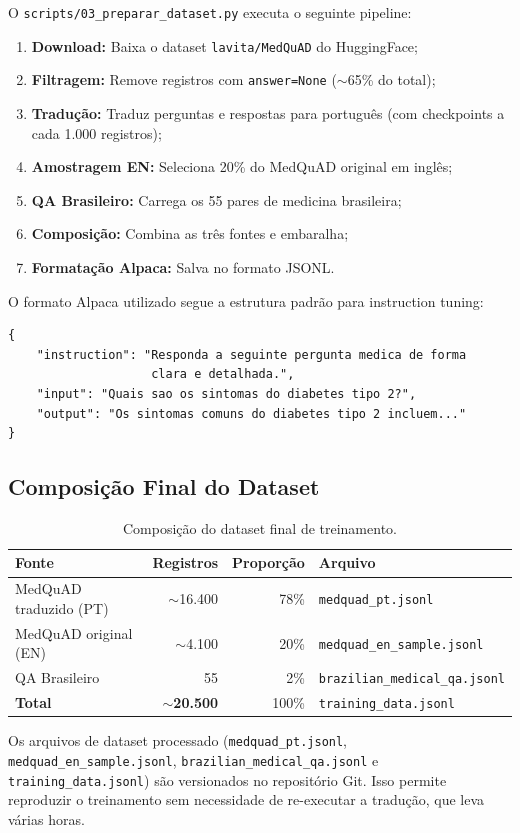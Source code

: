 O \texttt{scripts/03\_preparar\_dataset.py} executa o seguinte pipeline:

\begin{enumerate}
    \item \textbf{Download:} Baixa o dataset \texttt{lavita/MedQuAD} do HuggingFace;
    \item \textbf{Filtragem:} Remove registros com \texttt{answer=None} ($\sim$65\% do total);
    \item \textbf{Tradução:} Traduz perguntas e respostas para português (com checkpoints a cada 1.000 registros);
    \item \textbf{Amostragem EN:} Seleciona 20\% do MedQuAD original em inglês;
    \item \textbf{QA Brasileiro:} Carrega os 55 pares de medicina brasileira;
    \item \textbf{Composição:} Combina as três fontes e embaralha;
    \item \textbf{Formatação Alpaca:} Salva no formato JSONL.
\end{enumerate}

O formato Alpaca utilizado segue a estrutura padrão para instruction tuning:

\begin{lstlisting}[caption={Formato Alpaca para fine-tuning.}]
{
    "instruction": "Responda a seguinte pergunta medica de forma
                    clara e detalhada.",
    "input": "Quais sao os sintomas do diabetes tipo 2?",
    "output": "Os sintomas comuns do diabetes tipo 2 incluem..."
}
\end{lstlisting}

\subsection{Composição Final do Dataset}

\begin{table}[H]
\centering
\caption{Composição do dataset final de treinamento.}
\label{tab:composicao-dataset}
\begin{tabular}{l r r l}
\toprule
\textbf{Fonte} & \textbf{Registros} & \textbf{Proporção} & \textbf{Arquivo} \\
\midrule
MedQuAD traduzido (PT) & $\sim$16.400 & 78\% & \texttt{medquad\_pt.jsonl} \\
MedQuAD original (EN) & $\sim$4.100 & 20\% & \texttt{medquad\_en\_sample.jsonl} \\
QA Brasileiro & 55 & 2\% & \texttt{brazilian\_medical\_qa.jsonl} \\
\midrule
\textbf{Total} & \textbf{$\sim$20.500} & 100\% & \texttt{training\_data.jsonl} \\
\bottomrule
\end{tabular}
\end{table}

\begin{infobox}
Os arquivos de dataset processado (\texttt{medquad\_pt.jsonl}, \texttt{medquad\_en\_sample.jsonl}, \texttt{brazilian\_medical\_qa.jsonl} e \texttt{training\_data.jsonl}) são versionados no repositório Git. Isso permite reproduzir o treinamento sem necessidade de re-executar a tradução, que leva várias horas.
\end{infobox}
